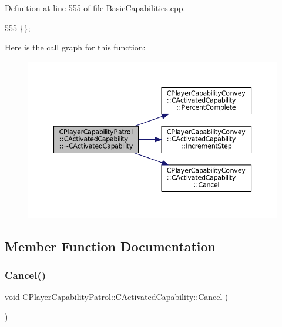 Definition at line 555 of file Basic\+Capabilities.\+cpp.


\begin{DoxyCode}
555 \{\};
\end{DoxyCode}
Here is the call graph for this function\+:\nopagebreak
\begin{figure}[H]
\begin{center}
\leavevmode
\includegraphics[width=350pt]{classCPlayerCapabilityPatrol_1_1CActivatedCapability_a2ad25677321b38e90d4e94abb0401aab_cgraph}
\end{center}
\end{figure}


\subsection{Member Function Documentation}
\hypertarget{classCPlayerCapabilityPatrol_1_1CActivatedCapability_a36165c232eb283ce4a92bd4606480c73}{}\label{classCPlayerCapabilityPatrol_1_1CActivatedCapability_a36165c232eb283ce4a92bd4606480c73} 
\subsubsection{\texorpdfstring{Cancel()}{Cancel()}}
{\footnotesize\ttfamily void C\+Player\+Capability\+Patrol\+::\+C\+Activated\+Capability\+::\+Cancel (\begin{DoxyParamCaption}{ }\end{DoxyParamCaption})\hspace{0.3cm}{\ttfamily [virtual]}}



